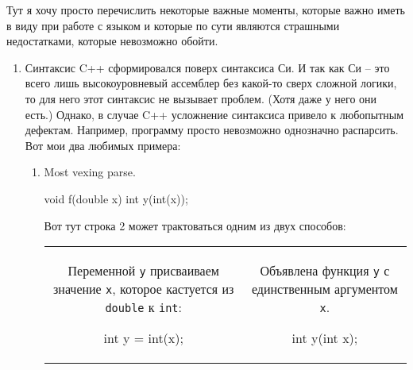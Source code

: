 Тут я хочу просто перечислить некоторые важные моменты, которые важно иметь в виду при работе с языком и которые по сути являются страшными недостатками, которые невозможно обойти.
\begin{enumerate}
\item %
Синтаксис C++ сформировался поверх синтаксиса Си.
И так как Си -- это всего лишь высокоуровневый ассемблер без какой-то сверх сложной логики, то для него этот синтаксис не вызывает проблем.
(Хотя даже у него они есть.) Однако, в случае C++ усложнение синтаксиса привело к любопытным дефектам.
Например, программу просто невозможно однозначно распарсить.
Вот мои два любимых примера:
\begin{enumerate}
\item Most vexing parse.

\begin{cppcode}
void f(double x) {
  int y(int(x));
}
\end{cppcode}
Вот тут строка 2 может трактоваться одним из двух способов:
\begin{center}
\begin{tabular}{cc}
{
\begin{minipage}{7cm}
Переменной \verb"y" присваиваем значение \verb"x", которое кастуется из \verb"double" к \verb"int":
\begin{cppcode}[numbers=none]
int y = int(x);
\end{cppcode}
\end{minipage}
}&{
\begin{minipage}{7cm}
Объявлена функция \verb"y" с единственным аргументом \verb"x".
\begin{cppcode}[numbers=none]
int y(int x);
\end{cppcode}
\end{minipage}
}\\
\end{tabular}
\end{center}


\end{enumerate}
\end{enumerate}
